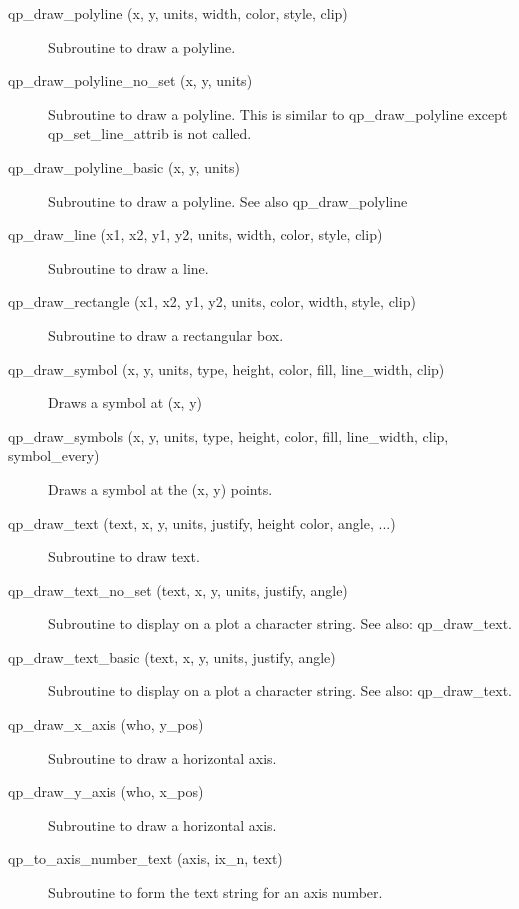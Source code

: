 \begin{description}
\item[qp\_draw\_polyline (x, y, units, width, color, style, clip)] \Newline 
     Subroutine to draw a polyline.

\item[qp\_draw\_polyline\_no\_set (x, y, units)] \Newline 
Subroutine to draw a polyline.
This is similar to qp\_draw\_polyline except qp\_set\_line\_attrib is not called.

\item[qp\_draw\_polyline\_basic (x, y, units) ] \Newline 
     Subroutine to draw a polyline. See also qp\_draw\_polyline

\item[qp\_draw\_line (x1, x2, y1, y2, units, width, color, style, clip)] \Newline 
     Subroutine to draw a line.

\item[qp\_draw\_rectangle (x1, x2, y1, y2, units, color, width,
                                             style, clip) ] \Newline 
     Subroutine to draw a rectangular box.

\item[qp\_draw\_symbol (x, y, units, type, height, color, 
                                fill, line\_width, clip) ] \Newline 
     Draws a symbol at (x, y) 

\item[qp\_draw\_symbols (x, y, units, type, height, color,
            fill, line\_width, clip, symbol\_every) ] \Newline 
     Draws a symbol at the (x, y) points. 

\item[qp\_draw\_text (text, x, y, units, justify, height
        color, angle, ...) ] \Newline 
     Subroutine to draw text.

\item[qp\_draw\_text\_no\_set (text, x, y, units, justify, angle)] \Newline 
Subroutine to display on a plot a character string.
See also: qp\_draw\_text.

\item[qp\_draw\_text\_basic (text, x, y, units, justify, angle)] \Newline 
     Subroutine to display on a plot a character string.
     See also: qp\_draw\_text.

\item[qp\_draw\_x\_axis (who, y\_pos)] \Newline 
     Subroutine to draw a horizontal axis.

\item[qp\_draw\_y\_axis (who, x\_pos)] \Newline 
     Subroutine to draw a horizontal axis.

\item[qp\_to\_axis\_number\_text (axis, ix\_n, text)] \Newline 
     Subroutine to form the text string for an axis number.

\end{description}

